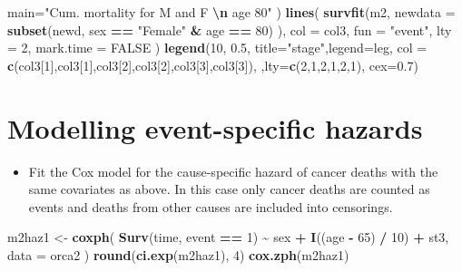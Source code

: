 \documentclass[
]{book}
\newenvironment{Shaded}{\begin{snugshade}}{\end{snugshade}}
\newcommand{\AttributeTok}[1]{\textcolor[rgb]{0.13,0.29,0.53}{#1}}
\newcommand{\ConstantTok}[1]{\textcolor[rgb]{0.56,0.35,0.01}{#1}}
\newcommand{\DecValTok}[1]{\textcolor[rgb]{0.00,0.00,0.81}{#1}}
\newcommand{\FloatTok}[1]{\textcolor[rgb]{0.00,0.00,0.81}{#1}}
\newcommand{\FunctionTok}[1]{\textcolor[rgb]{0.13,0.29,0.53}{\textbf{#1}}}
\newcommand{\NormalTok}[1]{#1}
\newcommand{\OtherTok}[1]{\textcolor[rgb]{0.56,0.35,0.01}{#1}}
\newcommand{\SpecialCharTok}[1]{\textcolor[rgb]{0.81,0.36,0.00}{\textbf{#1}}}
\newcommand{\StringTok}[1]{\textcolor[rgb]{0.31,0.60,0.02}{#1}}
\providecommand{\tightlist}{%
  \setlength{\itemsep}{0pt}\setlength{\parskip}{0pt}}
\begin{document}
\begin{Shaded}
\begin{Highlighting}[]
   \AttributeTok{main=}\StringTok{"Cum. mortality for M and F }\SpecialCharTok{\textbackslash{}n}\StringTok{ age 80"}
\NormalTok{)}
\FunctionTok{lines}\NormalTok{(}
  \FunctionTok{survfit}\NormalTok{(m2, }\AttributeTok{newdata =} \FunctionTok{subset}\NormalTok{(newd, sex }\SpecialCharTok{==} \StringTok{"Female"} \SpecialCharTok{\&}\NormalTok{ age }\SpecialCharTok{==} \DecValTok{80}\NormalTok{)  ),}
  \AttributeTok{col =}\NormalTok{ col3, }\AttributeTok{fun =} \StringTok{"event"}\NormalTok{, }\AttributeTok{lty =} \DecValTok{2}\NormalTok{, }\AttributeTok{mark.time =} \ConstantTok{FALSE}
\NormalTok{)}
\FunctionTok{legend}\NormalTok{(}\DecValTok{10}\NormalTok{, }\FloatTok{0.5}\NormalTok{, }\AttributeTok{title=}\StringTok{"stage"}\NormalTok{,}\AttributeTok{legend=}\NormalTok{leg,}
       \AttributeTok{col =} \FunctionTok{c}\NormalTok{(col3[}\DecValTok{1}\NormalTok{],col3[}\DecValTok{1}\NormalTok{],col3[}\DecValTok{2}\NormalTok{],col3[}\DecValTok{2}\NormalTok{],col3[}\DecValTok{3}\NormalTok{],col3[}\DecValTok{3}\NormalTok{]),}
\NormalTok{        ,}\AttributeTok{lty=}\FunctionTok{c}\NormalTok{(}\DecValTok{2}\NormalTok{,}\DecValTok{1}\NormalTok{,}\DecValTok{2}\NormalTok{,}\DecValTok{1}\NormalTok{,}\DecValTok{2}\NormalTok{,}\DecValTok{1}\NormalTok{), }\AttributeTok{cex=}\FloatTok{0.7}\NormalTok{)}
\end{Highlighting}
\end{Shaded}

\section{Modelling event-specific hazards}\label{modelling-event-specific-hazards}

\begin{itemize}
\tightlist
\item
  Fit the Cox model for the cause-specific hazard of cancer deaths with
  the same covariates as above. In this case only cancer deaths are
  counted as events and deaths from other causes are included into
  censorings.
\end{itemize}

\begin{Shaded}
\begin{Highlighting}[]
\NormalTok{m2haz1 }\OtherTok{\textless{}{-}} 
  \FunctionTok{coxph}\NormalTok{(}
    \FunctionTok{Surv}\NormalTok{(time, event }\SpecialCharTok{==} \DecValTok{1}\NormalTok{) }\SpecialCharTok{\textasciitilde{}}\NormalTok{ sex }\SpecialCharTok{+} \FunctionTok{I}\NormalTok{((age }\SpecialCharTok{{-}} \DecValTok{65}\NormalTok{) }\SpecialCharTok{/} \DecValTok{10}\NormalTok{) }\SpecialCharTok{+}\NormalTok{ st3, }
    \AttributeTok{data =}\NormalTok{ orca2}
\NormalTok{  )}
\FunctionTok{round}\NormalTok{(}\FunctionTok{ci.exp}\NormalTok{(m2haz1), }\DecValTok{4}\NormalTok{)}
\FunctionTok{cox.zph}\NormalTok{(m2haz1)}
\end{Highlighting}
\end{Shaded}
\end{document}
